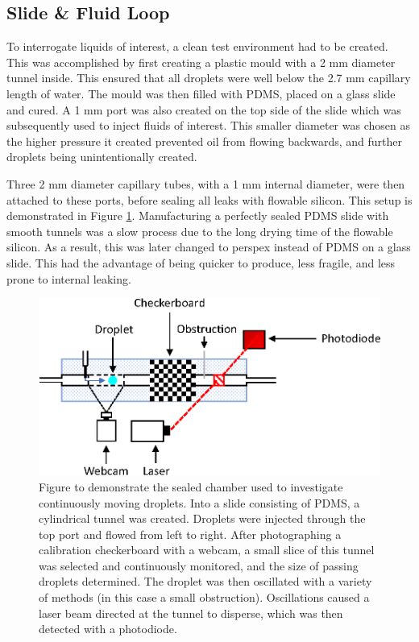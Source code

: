\documentclass{physics_article_B}
\begin{document}
    \subsection{Slide \& Fluid Loop\label{sect:method:slide}}
    
        To interrogate liquids of interest, a clean test environment had to be created. This was accomplished by first creating a plastic mould with a 2 mm diameter tunnel inside. This ensured that all droplets were well below the 2.7 mm capillary length of water\cite{capillary}. The mould was then filled with PDMS, placed on a glass slide and cured. A 1 mm port was also created on the top side of the slide which was subsequently used to inject fluids of interest. This smaller diameter was chosen as the higher pressure it created prevented oil from flowing backwards, and further droplets being unintentionally created.
        
        Three 2 mm diameter capillary tubes, with a 1 mm internal diameter, were then attached to these ports, before sealing all leaks with flowable silicon. This setup is demonstrated in Figure \ref{fig:slide}. Manufacturing a perfectly sealed PDMS slide with smooth tunnels was a slow process due to the long drying time of the flowable silicon. As a result, this was later changed to perspex instead of PDMS on a glass slide. This had the advantage of being quicker to produce, less fragile, and less prone to internal leaking. 
        
            \begin{figure}[H]
                \centering
                    \hspace*{2.4cm}\includegraphics[scale=0.9]{Figures/Control.eps}
                    \caption{Figure to demonstrate the sealed chamber used to investigate continuously moving droplets. Into a slide consisting of PDMS, a cylindrical tunnel was created. Droplets were injected through the top port and flowed from left to right. After photographing a calibration checkerboard with a webcam, a small slice of this tunnel was selected and continuously monitored, and the size of passing droplets determined. The droplet was then oscillated with a variety of methods (in this case a small obstruction). Oscillations caused a laser beam directed at the tunnel to disperse, which was then detected with a photodiode.} 
                \label{fig:slide}
            \end{figure} 
    
\end{document}
